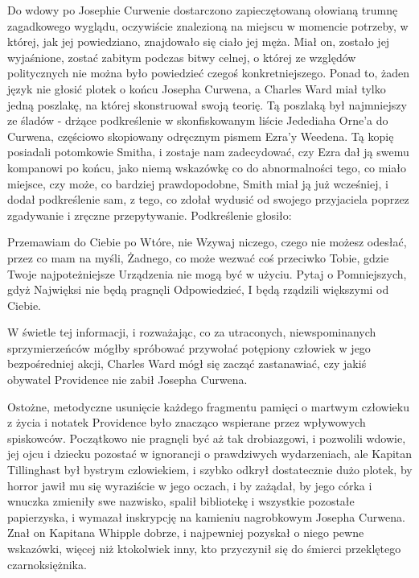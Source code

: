 Do wdowy po Josephie Curwenie dostarczono zapieczętowaną ołowianą trumnę zagadkowego wyglądu, oczywiście znalezioną na miejscu w momencie potrzeby, w której, jak jej powiedziano, znajdowało się ciało jej męża. Miał on, zostało jej wyjaśnione, zostać zabitym podczas bitwy celnej, o której ze względów politycznych nie można było powiedzieć czegoś konkretniejszego. Ponad to, żaden język nie głosić plotek o końcu Josepha Curwena, a Charles Ward miał tylko jedną poszlakę, na której skonstruował swoją teorię. Tą poszlaką był najmniejszy ze śladów - drżące podkreślenie w skonfiskowanym liście Jedediaha Orne'a do Curwena, częściowo skopiowany odręcznym pismem Ezra'y Weedena. Tą kopię posiadali potomkowie Smitha, i zostaje nam zadecydować, czy Ezra dał ją swemu kompanowi po końcu, jako niemą wskazówkę co do abnormalności tego, co miało miejsce, czy może, co bardziej prawdopodobne, Smith miał ją już wcześniej, i dodał podkreślenie sam, z tego, co zdołał wydusić od swojego przyjaciela poprzez zgadywanie i zręczne przepytywanie. Podkreślenie głosiło: 

\begin{displayquote}

Przemawiam do Ciebie po Wtóre, nie Wzywaj niczego, czego nie możesz odesłać, przez co mam na myśli, Żadnego, co może wezwać coś przeciwko Tobie, gdzie Twoje najpoteżniejsze Urządzenia nie mogą być w użyciu. Pytaj o Pomniejszych, gdyż Najwięksi nie będą pragnęli Odpowiedzieć, I będą rządzili większymi od Ciebie.

\end{displayquote}

W świetle tej informacji, i rozważając, co za utraconych, niewspominanych sprzymierzeńców mógłby spróbować przywołać potępiony człowiek  w jego bezpośredniej akcji, Charles Ward mógł się zacząć zastanawiać, czy jakiś obywatel Providence nie zabił Josepha Curwena. 

Ostożne, metodyczne usunięcie każdego fragmentu pamięci o martwym człowieku z życia i notatek Providence było znacząco wspierane przez wpływowych spiskowców. Początkowo nie pragnęli być aż tak drobiazgowi, i pozwolili wdowie, jej ojcu i dziecku pozostać w ignorancji o prawdziwych wydarzeniach, ale Kapitan Tillinghast był bystrym czlowiekiem, i szybko odkrył dostatecznie dużo plotek, by horror jawił mu się wyraziście w jego oczach, i by zażądał, by jego córka i wnuczka zmieniły swe nazwisko, spalił bibliotekę i wszystkie pozostałe papierzyska, i wymazał inskrypcję na kamieniu nagrobkowym Josepha Curwena. Znał on Kapitana Whipple dobrze, i najpewniej pozyskał o niego pewne wskazówki, więcej niż ktokolwiek inny, kto przyczynił się do śmierci przeklętego czarnoksiężnika. 

